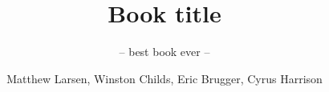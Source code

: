 \documentclass[graybox,envcountchap,sectrefs]{svmono}
\begin{document}
\author{Matthew Larsen, Winston Childs, Eric Brugger, Cyrus Harrison}
\title{Book title}
\subtitle{-- best book ever --}
\maketitle

\frontmatter%

%
%
%
%

\tableofcontents

%


\mainmatter%
%

%
%

\backmatter%
%
%
\printindex



\end{document}
